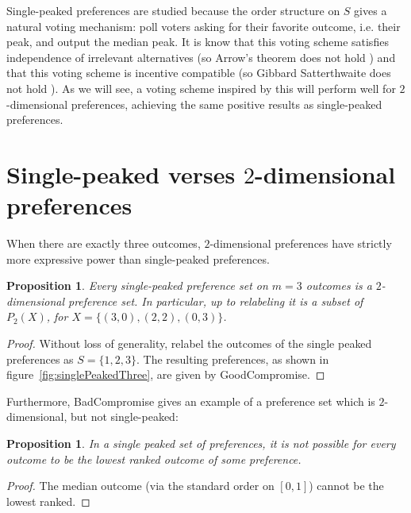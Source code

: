 \documentclass[12pt]{article}
\newtheorem{proposition}[theorem]{Proposition}
\newcommand{\1}[1]{\mathds{1}[{#1}]}
\begin{document}
    Single-peaked preferences are studied because the order structure on $S$
    gives a natural voting mechanism: poll voters asking for their favorite
    outcome, i.e. their peak, and output the median peak.
    It is know that this voting scheme satisfies independence of irrelevant
    alternatives (so Arrow's theorem does not hold
    \cite{AgtBookMechDesignInto}) and that this voting scheme is incentive
    compatible (so Gibbard Satterthwaite does not hold \cite{AgtBookNoMoney}).
    As we will see, a voting scheme inspired by this will perform well for
    $2$-dimensional preferences, achieving the same positive results as
    single-peaked preferences.

\section{Single-peaked verses $2$-dimensional preferences}
  \label{sec:singleVsTwoD}


  When there are exactly three outcomes, $2$-dimensional
  preferences have strictly more expressive power than
  single-peaked preferences.
  \begin{proposition}
    Every single-peaked preference set on $m=3$ outcomes
    is a $2$-dimensional preference set. In particular,
    up to relabeling it is a subset of $P_2(X)$, for
    $X = \{ (3,0), (2,2), (0,3) \}$.
  \end{proposition}
  \begin{proof}
    Without loss of generality, relabel the outcomes
    of the single peaked preferences as $S = \{1,2,3\}$.
    The resulting preferences, as shown in figure~\ref{fig:singlePeakedThree},
    are given by {\sc GoodCompromise}.
  \end{proof}
  Furthermore, {\sc BadCompromise} gives an example of a preference set
  which is $2$-dimensional, but not single-peaked:
  \begin{proposition} \label{prop:noLeastFavorite}
    In a single peaked set of preferences, it is not possible
    for every outcome to be the lowest ranked outcome of some preference.
  \end{proposition}
  \begin{proof}
    The median outcome (via the standard order on $[0,1]$)
    cannot be the lowest ranked.
  \end{proof}
\end{document}
